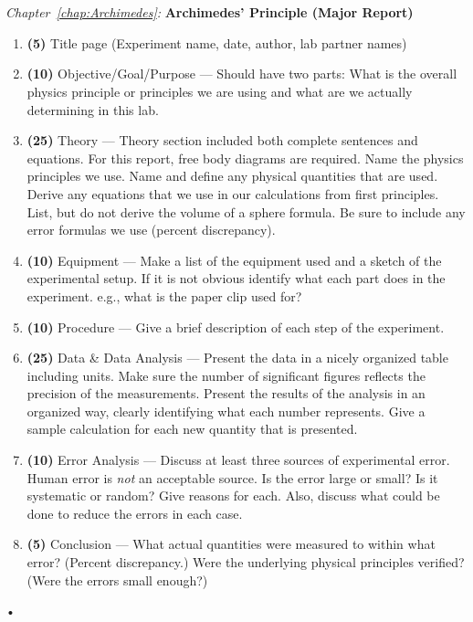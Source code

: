 \documentclass[main.tex]{subfiles}
\begin{document}
\begin{samepage}
\hrulefill\\ \\
\emph{Chapter~\ref{chap:Archimedes}:} \textbf{Archimedes' Principle (Major Report)}
\begin{enumerate}
\item
\textbf{(5)} Title page (Experiment name, date, author, lab partner names)
\item
\textbf{(10)} Objective/Goal/Purpose --- Should have two parts: What is the overall physics principle or principles we are using and what are we actually determining in this lab. 
\item
\textbf{(25)} Theory --- Theory section included both complete sentences and equations. For this report, free body diagrams are required. Name the physics principles we use. Name and define any physical quantities that are used. Derive any equations that we use in our calculations from first principles. List, but do not derive the volume of a sphere formula. Be sure to include any error formulas we use (percent discrepancy).
\item
\textbf{(10)} Equipment --- Make a list of the equipment used and a sketch of the experimental setup. If it is not obvious identify what each part does in the experiment. e.g., what is the paper clip used for?
\item
\textbf{(10)} Procedure --- Give a brief description of each step of the experiment.
\item
\textbf{(25)} Data \& Data Analysis --- Present the data in a nicely organized table including units. Make sure the number of significant figures reflects the precision of the measurements. Present the results of the analysis in an organized way, clearly identifying what each number represents. Give a sample calculation for each new quantity that is presented.
\item
\textbf{(10)} Error Analysis --- Discuss at least three sources of experimental error. Human error is \emph{not} an acceptable source. Is the error large or small? Is it systematic or random? Give reasons for each. Also, discuss what could be done to reduce the errors in each case.
\item
\textbf{(5)} Conclusion --- What actual quantities were measured to within what error? (Percent discrepancy.) Were the underlying physical principles verified? (Were the errors small enough?)
\end{enumerate}•
\end{samepage}
\end{document}
